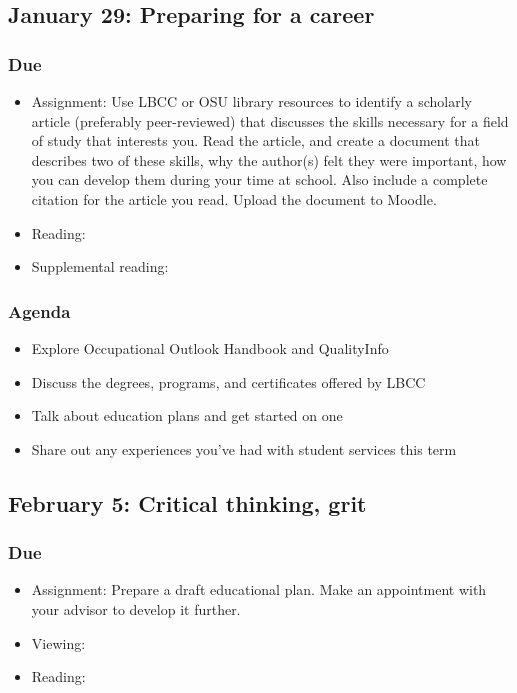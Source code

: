 \documentclass[12pt,article,oneside]{memoir}
\begin{document}
\subsection{January 29: Preparing for a career}
\subsubsection{Due}
\begin{itemize}
 \item Assignment: Use LBCC or OSU library resources to identify a scholarly article (preferably peer-reviewed) that discusses the skills necessary for a field of study that interests you.  Read the article, and create a document that describes two of these skills, why the author(s) felt they were important, how you can develop them during your time at school. Also include a complete citation for the article you read.  Upload the document to Moodle.
 \item Reading: \cite{worksheets}
 \item Supplemental reading: \cite{crosswalk,ooh}
\end{itemize}

\subsubsection{Agenda}
\begin{itemize}
 \item Explore Occupational Outlook Handbook and QualityInfo
 \item Discuss the degrees, programs, and certificates offered by LBCC
\item Talk about education plans and get started on one
 \item Share out any experiences you've had with student services this term
\end{itemize}


\subsection{February 5: Critical thinking, grit}
\subsubsection{Due}
\begin{itemize}
 \item Assignment: Prepare a draft educational plan.  Make an appointment with your advisor to develop it further.
 \item Viewing: \cite{duckworth}
 \item Reading: \cite{sultan}
\end{itemize}
\end{document}
